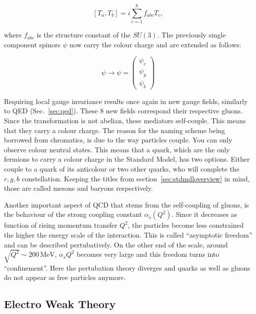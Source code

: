 \begin{equation}
  \label{eq:qcdgencommute}
  \left[ T_a, T_b \right] = i \sum_{c=1}^8 f_{abc} T_c,
\end{equation}

\noindent where $f_{abc}$ is the structure constant of the $SU(3)$. The previously single component spinors $\psi$ now carry the colour charge and are extended as follows:

\begin{equation}
  \label{eq:colorspinor}
  \psi \rightarrow \psi = \begin{pmatrix}
    \psi_r \\
    \psi_g \\
    \psi_b
  \end{pmatrix}
\end{equation}

\noindent Requiring local gauge invariance results once again in new gauge fields, similarly to QED (Sec.~\ref{sec:qed}). These 8 new fields correspond their respective gluons. Since the transformation is not abelian, these mediators self-couple. This means that they carry a colour charge. The reason for the naming scheme being borrowed from chromatics, is due to the way particles couple. You can only observe colour neutral states. This means that a quark, which are the only fermions to carry a colour charge in the Standard Model, has two options. Either couple to a quark of its anticolour or two other quarks, who will complete the $r,g,b$ constellation. Keeping the titles from section~\ref{sec:stdmdloverview} in mind, those are called mesons and baryons respectively.

Another important aspect of QCD that stems from the self-coupling of gluons, is the behaviour of the strong coupling constant $\alpha_s(Q^2)$. Since it decreases as function of rising momentum transfer $Q^2$, the particles become less constrained the higher the energy scale of the interaction. This is called ``asymptotic freedom'' and can be described pertubatively. On the other end of the scale, around $\sqrt{Q^2} \sim 200\,\text{MeV}$, $\alpha_s{Q^2}$ becomes very large and this freedom turns into ``confinement''. Here the pertubation theory diverges and quarks as well as gluons do not appear as free particles anymore.

\subsection{Electro Weak Theory}

